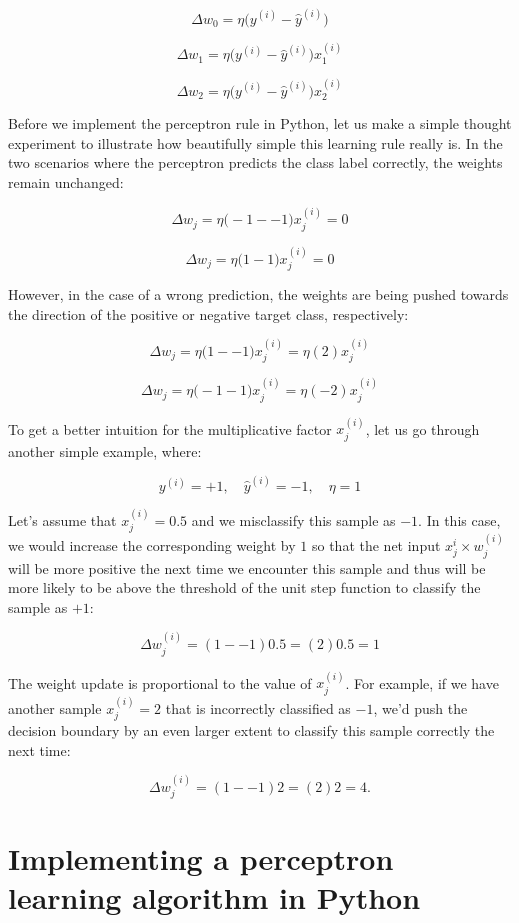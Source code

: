 \documentclass[letterpaper]{report}
\begin{document}
\[
\Delta w_0 = \eta \bigg(  y^{(i)} - \hat{y}^{(i)} \bigg) 
\]

\[
\Delta w_1 = \eta \bigg(  y^{(i)} - \hat{y}^{(i)} \bigg) x_{1}^{(i)}
\]

\[
\Delta w_2 = \eta \bigg(  y^{(i)} - \hat{y}^{(i)} \bigg) x_{2}^{(i)}
\]

Before we implement the perceptron rule in Python, let us make a simple thought experiment to illustrate how beautifully simple this learning rule really is. In the two scenarios where the perceptron predicts the class label correctly, the weights remain unchanged:

\[
\Delta w_j = \eta \bigg( -1 -- 1 \bigg)x_{j}^{(i)} = 0
\]

\[
\Delta w_j = \eta \bigg( 1-1 \bigg)x_{j}^{(i)} = 0
\]

However, in the case of a wrong prediction, the weights are being pushed towards the direction of the positive or negative target class, respectively:

\[
\Delta w_j = \eta \bigg( 1 -- 1 \bigg)x_{j}^{(i)} = \eta(2)x_{j}^{(i)}
\]

\[
\Delta w_j = \eta \bigg( -1-1 \bigg)x_{j}^{(i)} = \eta(-2)x_{j}^{(i)}
\]


To get a better intuition for the multiplicative factor $x_{j}^{(i)}$, let us go through another
simple example, where:

\[
y^{(i)} = +1, \quad \hat{y}^{(i)} = -1, \quad \eta = 1
 \]

Let's assume that $x_{j}^{(i)}=0.5$ and we misclassify this sample as $-1$. In this case, we would increase the corresponding weight by $1$ so that the net input $x_{j}^{i} \times w_{j}^{(i)}$ will be more positive the next time we encounter this sample and thus will be more likely to be above the threshold of the unit step function to classify the sample as  $+1$:

\[
\Delta w_{j}^{(i)} = (1--1)0.5 = (2)0.5 = 1
\]

The weight update is proportional to the value of $x_{j}^{(i)}$. For example, if we have another sample $x_{j}^{(i)}=2$ that is incorrectly classified as $-1$, we'd push the decision boundary by an even larger extent to classify this sample correctly the next time:

\[
\Delta w_{j}^{(i)} = (1--1)2 = (2)2 = 4.
\]


\section{Implementing a perceptron learning algorithm in Python}
\end{document}

